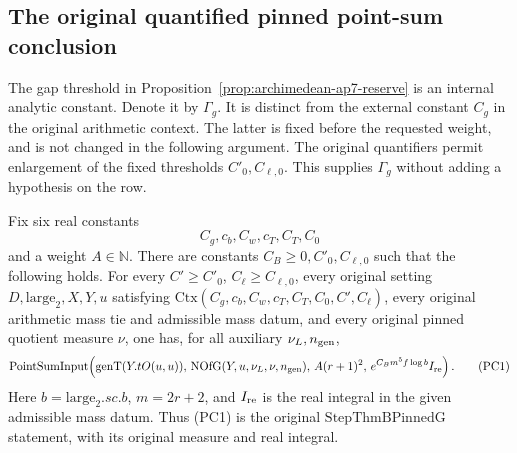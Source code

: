 \subsection{The original quantified pinned point-sum conclusion}
\label{sec:archimedean-pinned-row-closure}

The gap threshold in Proposition~\ref{prop:archimedean-ap7-reserve}
is an internal analytic constant. Denote it by \(\Gamma_g\).
It is distinct from the external constant \(C_g\) in the
original arithmetic context. The latter is fixed before the
requested weight, and is not changed in the following argument.
The original quantifiers permit enlargement of the fixed
thresholds \(C'_0,C_{\ell,0}\). This supplies \(\Gamma_g\)
without adding a hypothesis on the row.
\cite{current-construction-record}

\begin{theorem}
\label{thm:archimedean-pinned-row-closure}
Fix six real constants
\[
                 C_g,c_b,C_w,c_T,C_T,C_0
\]
and a weight \(A\in\mathbb N\). There are constants
\(C_B\ge0,C'_0,C_{\ell,0}\) such that the following holds.
For every \(C'\ge C'_0\), \(C_\ell\ge C_{\ell,0}\), every
original setting \(D,\mathrm{large}_2,X,Y,u\) satisfying
\(\mathrm{Ctx}(C_g,c_b,C_w,c_T,C_T,C_0,C',C_\ell)\),
every original arithmetic mass tie and admissible mass datum,
and every original pinned quotient measure \(\nu\), one has,
for all auxiliary \(\nu_L,n_{\rm gen}\),
\[
 \mathrm{PointSumInput}\!\left(
   \mathrm{genT}(Y.tO(u,u)),\,
   \mathrm{NOfG}(Y,u,\nu_L,\nu,n_{\rm gen}),\,
   A(r+1)^2,\,
   e^{C_Bm^5f\log b}I_{\rm re}\right).
                                                        \tag{PC1}
\]
Here \(b=\mathrm{large}_2.sc.b\), \(m=2r+2\), and
\(I_{\rm re}\) is the real integral in the given admissible
mass datum. Thus (PC1) is the original
\(\mathrm{StepThmBPinnedG}\) statement, with its original
measure and real integral.
\end{theorem}

